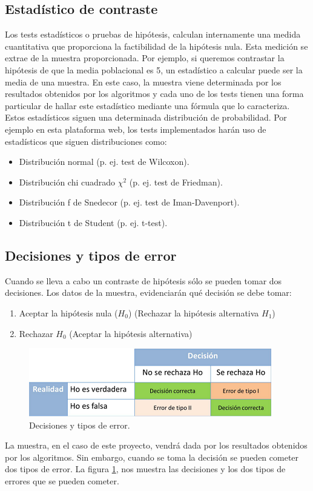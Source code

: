 
\subsection{Estadístico de contraste}
Los tests estadísticos o pruebas de hipótesis, calculan internamente una medida cuantitativa que proporciona la
factibilidad de la hipótesis nula. Esta medición se extrae de la muestra proporcionada. Por ejemplo, si queremos
contrastar la hipótesis de que la media poblacional es 5, un estadístico a calcular puede ser la media de una
muestra. En este caso, la muestra viene determinada por los resultados obtenidos por los algoritmos y cada uno de
los tests tienen una forma particular de hallar este estadístico mediante una fórmula que lo caracteriza. Estos
estadísticos siguen una determinada distribución de probabilidad. Por ejemplo en esta plataforma web, los tests
implementados harán uso de estadísticos que siguen distribuciones como:
\begin{itemize}
\item Distribución normal (p. ej. test de Wilcoxon).
\item Distribución chi cuadrado $\chi^2$ (p. ej. test de Friedman).
\item Distribución f de Snedecor (p. ej. test de Iman-Davenport).
\item Distribución t de Student (p. ej. t-test).
\end{itemize}


\subsection{Decisiones y tipos de error}
Cuando se lleva a cabo un contraste de hipótesis sólo se pueden tomar dos decisiones. Los datos de la muestra,
evidenciarán qué decisión se debe tomar:
\begin{enumerate}
\item Aceptar la hipótesis nula ($H_0$) (Rechazar la hipótesis alternativa $H_1$)
\item Rechazar $H_0$ (Aceptar la hipótesis alternativa)
\end{enumerate}
\begin{figure}[h]
\centering
\includegraphics{figuras/figura1.png}
\caption{Decisiones y tipos de error.}
\label{fig:decision}
\end{figure}
La muestra, en el caso de este proyecto, vendrá dada por los resultados obtenidos por los algoritmos. Sin embargo,
cuando se toma la decisión se pueden cometer dos tipos de error. La figura \ref{fig:decision}, nos muestra las
decisiones y los dos tipos de errores que se pueden cometer.

